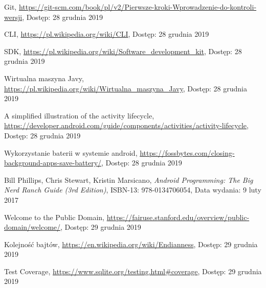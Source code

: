 \documentclass[a4paper,12pt, twoside]{article}
\begin{document}
\begin{thebibliography}{}
		Git,
		\newline\url{https://git-scm.com/book/pl/v2/Pierwsze-kroki-Wprowadzenie-do-kontroli-wersji}, 
		\newline Dostęp: 28 grudnia 2019

		CLI,
		\newline\url{https://pl.wikipedia.org/wiki/CLI}, 
		\newline Dostęp: 28 grudnia 2019
		
		SDK,
		\newline\url{https://pl.wikipedia.org/wiki/Software_development_kit}, 
		\newline Dostęp: 28 grudnia 2019
		
		Wirtualna maszyna Javy,
		\newline\url{https://pl.wikipedia.org/wiki/Wirtualna_maszyna_Javy}, 
		\newline Dostęp: 28 grudnia 2019
		
		A simplified illustration of the activity lifecycle,
		\newline\url{https://developer.android.com/guide/components/activities/activity-lifecycle}, 
		\newline Dostęp: 28 grudnia 2019
		
		Wykorzystanie baterii w systemie android,
		\newline\url{https://fossbytes.com/closing-background-apps-save-battery/}, 
		\newline Dostęp: 28 grudnia 2019
		
	    Bill Phillips, Chris Stewart, Kristin Marsicano, \textit{Android Programming: The Big Nerd Ranch Guide (3rd Edition)}, ISBN-13: 978-0134706054,
		\newline Data wydania: 9 luty 2017
		
		Welcome to the Public Domain,
		\newline\url{https://fairuse.stanford.edu/overview/public-domain/welcome/}, 
		\newline Dostęp: 29 grudnia 2019
		
		Kolejność bajtów,
		\newline\url{https://en.wikipedia.org/wiki/Endianness}, 
		\newline Dostęp: 29 grudnia 2019
		
		Test Coverage,
		\newline\url{https://www.sqlite.org/testing.html#coverage}, 
		\newline Dostęp: 29 grudnia 2019
		

\end{thebibliography}
\end{document}
